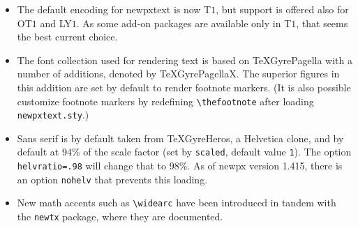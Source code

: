 \documentclass[11pt]{article}
\theoremstyle{oldplain}
\theoremstyle{plain}
\begin{document}
\begin{itemize}
\item The default encoding for \textsf{newpxtext} is now T$1$, but support is offered also for OT$1$ and LY$1$. As some add-on packages are available only in T$1$, that seems the best current choice.
\item The font collection used for rendering text is based on TeXGyrePagella with a number of additions, denoted by TeXGyrePagellaX. The superior figures in this addition are set by default to render footnote markers. (It is also possible customize footnote markers by redefining \verb|\thefootnote| after loading {\tt newpxtext.sty}.) 
\item Sans serif is by default taken from TeXGyreHeros, a Helvetica clone, and by default at 94\% of the scale factor (set by {\tt scaled}, default value {\tt1}). The option {\tt helvratio=.98} will change that to 98\%. As of newpx version 1.415, there is an option {\tt nohelv} that prevents this loading.
\item New math accents such as \verb|\widearc| have been introduced in tandem with the {\tt newtx} package, where they are documented.
\end{itemize}
\end{document}
